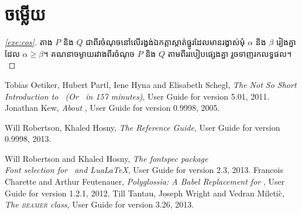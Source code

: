 \documentclass[a4paper,12pt,oneside]{book}
\begin{document}
	\chapter{ចម្លើយ}\label{cha:ans}
	\begin{proof}[\ref{exe:cos}]
		តាង $ P $ និង $ Q $ ជាពីរចំណុចនៅលើរង្វង់ឯកត្តាស្កាត់ធ្នូរដែលមានរង្វាស់មុំ $ \alpha $ និង $ \beta $ រៀងគ្នាដែល $ \alpha\geq\beta $។ គណនាចម្ងាយរវាងពីរចំណុច $ P $ និង $ Q $ តាមពីររបៀបផ្សេងគ្នា រួចទាញរកលទ្ធផល។
	\end{proof}
	\backmatter
	\begin{thebibliography}{9}
		 Tobias Oetiker, Hubert Partl, Iene Hyna and Elisabeth Schegl,
		\newblock \emph{The Not So Short Introduction to \LaTeXe\ (Or \LaTeXe\ in 157 minutes)},
		\newblock User Guide for version 5.01, 2011.
		Jonathan Kew,
		\newblock \emph{About \XeTeX},
		\newblock User Guide for version 0.9998, 2005.
		
		 Will Robertson, Khaled Hosny,
		\newblock \emph{The \XeTeX{} Reference Guide},
		\newblock User Guide for version 0.9998, 2013.
		
		 Will Robertson and Khaled Hosny,
		\newblock \emph{The \emph{fontspec} package\\ Font selection for \XeLaTeX\ and Lua\LaTeX},
		\newblock User Guide for version 2.3, 2013.
		 Francois Charette and Arthur Feutenauer,
		\newblock \emph{Polyglossia: A Babel Replacement for \XeLaTeX},
		\newblock User Guide for version 1.2.1, 2012.
		 Till Tantau, Joseph Wright and Vedran Mileti\`c,
		\newblock \emph{The \textsc{beamer} \textit{class}},
		\newblock User Guide for version 3.26, 2013.
	\end{thebibliography}
\end{document}
